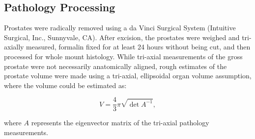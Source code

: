 \subsection{Pathology Processing}
Prostates were radically removed using a da Vinci Surgical System (Intuitive
Surgical\textregistered, Inc., Sunnyvale, CA).  After excision, the prostates
were weighed and tri-axially measured, formalin fixed for at least 24 hours
without being cut, and then processed for whole mount histology.  While
tri-axial measurements of the gross prostate were not necessarily anatomically
aligned, rough estimates of the prostate volume were made using a tri-axial,
ellipsoidal organ volume assumption, where the volume could be estimated as:

\begin{equation}\label{eqn:ellipsoid_volume}
V = \frac{4}{3}\pi \sqrt{\det{A^{-1}}},
\end{equation}

where $A$ represents the eigenvector matrix of the tri-axial pathology
measurements.

